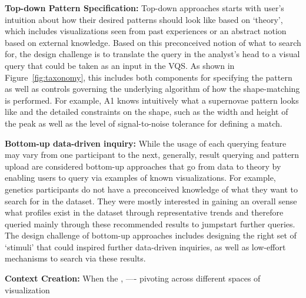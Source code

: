 \par \textbf{Top-down Pattern Specification:} Top-down approaches starts with user's intuition about how their desired patterns should look like based on `theory', which includes visualizations seen from past experiences or an abstract notion based on external knowledge. Based on this preconceived notion of what to search for, the design challenge is to translate the query in the analyst's head to a visual query that could be taken as an input in the VQS. As shown in Figure~\ref{fig:taxonomy}, this includes both components for specifying the pattern as well as controls governing the underlying algorithm of how the shape-matching is performed. For example, A1 knows intuitively what a supernovae pattern looks like and the detailed constraints on the shape, such as the width and height of the peak as well as the level of signal-to-noise tolerance for defining a match. %
\par \textbf{Bottom-up data-driven inquiry:} While the usage of each querying feature may vary from one participant to the next, generally, result querying and pattern upload are considered bottom-up approaches that go from data to theory by enabling users to query via examples of known visualizations. For example, genetics participants do not have a preconceived knowledge of what they want to search for in the dataset. They were mostly interested in gaining an overall sense what profiles exist in the dataset through representative trends and therefore queried mainly through these recommended results to jumpstart further queries. The design challenge of bottom-up approaches includes designing the right set of `stimuli' that could inspired further data-driven inquiries, as well as low-effort mechanisms to search via these results.
\par \textbf{Context Creation:} When the , ---- pivoting across different spaces of visualization

